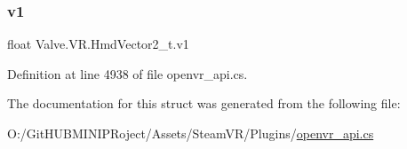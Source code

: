 \subsubsection{\texorpdfstring{v1}{v1}}
{\footnotesize\ttfamily float Valve.\+V\+R.\+Hmd\+Vector2\+\_\+t.\+v1}



Definition at line 4938 of file openvr\+\_\+api.\+cs.



The documentation for this struct was generated from the following file\+:\begin{DoxyCompactItemize}
\item 
O\+:/\+Git\+H\+U\+B\+M\+I\+N\+I\+P\+Roject/\+Assets/\+Steam\+V\+R/\+Plugins/\mbox{\hyperlink{openvr__api_8cs}{openvr\+\_\+api.\+cs}}\end{DoxyCompactItemize}
